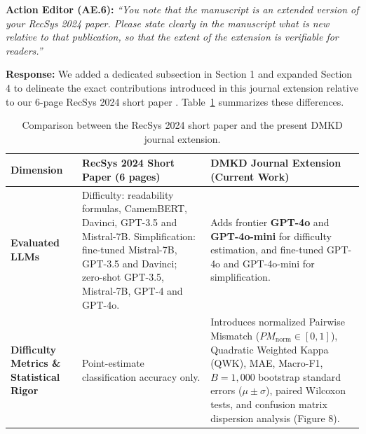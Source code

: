 \documentclass[11pt,a4paper]{article}
\newcommand{\mm}[1]{#1}
\newcommand{\mmhl}[1]{#1}
\begin{document}
\begin{reviewbox}
\textbf{Action Editor (AE.6):} \textit{``You note that the manuscript is an extended version of your RecSys 2024 paper. Please state clearly in the manuscript what is new relative to that publication, so that the extent of the extension is verifiable for readers.''}
\end{reviewbox}

\noindent\textbf{Response:}
We added a dedicated subsection in Section 1 and expanded Section 4 to delineate the exact contributions introduced in this journal extension relative to our \mmhl{6}-page RecSys 2024 short paper \cite{jamet2024evaluation}. Table~\ref{tab:rebuttal_recsys_delta} summarizes these differences.

\begin{table}[!htbp]
\centering
\scriptsize
\setlength{\tabcolsep}{3.5pt}
\renewcommand{\arraystretch}{0.92}
\caption{Comparison between the RecSys 2024 short paper \cite{jamet2024evaluation} and the present DMKD journal extension.}
\label{tab:rebuttal_recsys_delta}
\begin{tabular}{>{\raggedright\arraybackslash}p{2.9cm}>{\raggedright\arraybackslash}p{5.5cm}>{\raggedright\arraybackslash}p{7.0cm}}
\toprule
\textbf{Dimension} & \textbf{RecSys 2024 Short Paper (\mmhl{6} pages)} & \textbf{DMKD Journal Extension (Current Work)} \\
\midrule
\textbf{Evaluated LLMs} & \mm{Difficulty: readability formulas,} CamemBERT, Davinci, GPT-3.5 \mm{and Mistral-7B. Simplification: fine-tuned Mistral-7B, GPT-3.5 and Davinci; zero-shot GPT-3.5, Mistral-7B, GPT-4 and GPT-4o.} & Adds frontier \textbf{GPT-4o} and \textbf{GPT-4o-mini} \mm{for difficulty estimation, and fine-tuned GPT-4o and GPT-4o-mini for} simplification. \\
\addlinespace[2pt]
\textbf{Difficulty Metrics \& Statistical Rigor} & Point-estimate classification accuracy only. & Introduces normalized Pairwise Mismatch ($PM_{\text{norm}} \in [0, 1]$), Quadratic Weighted Kappa (QWK), MAE, Macro-F1, $B=1{,}000$ bootstrap standard errors ($\mu \pm \sigma$), paired Wilcoxon tests, and confusion matrix dispersion analysis (Figure 8). \\

\end{tabular}
\end{table}
\end{document}
